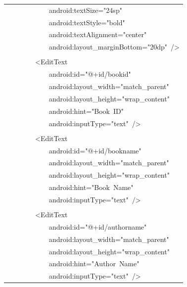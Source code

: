 \documentclass[a4paper,12pt]{article}
\begin{document}
\begin{longtable}{|p{}|}
{\ttfamily\small \ \ \ \ \ \ \ \ \ \ \ \ android:textSize="24sp"} \\
{\ttfamily\small \ \ \ \ \ \ \ \ \ \ \ \ android:textStyle="bold"} \\
{\ttfamily\small \ \ \ \ \ \ \ \ \ \ \ \ android:textAlignment="center"} \\
{\ttfamily\small \ \ \ \ \ \ \ \ \ \ \ \ android:layout\_marginBottom="20dp"\ /\textgreater{}} \\
\strut \\
{\ttfamily\small \ \ \ \ \ \ \ \ \textless{}EditText} \\
{\ttfamily\small \ \ \ \ \ \ \ \ \ \ \ \ android:id="@+id/bookid"} \\
{\ttfamily\small \ \ \ \ \ \ \ \ \ \ \ \ android:layout\_width="match\_parent"} \\
{\ttfamily\small \ \ \ \ \ \ \ \ \ \ \ \ android:layout\_height="wrap\_content"} \\
{\ttfamily\small \ \ \ \ \ \ \ \ \ \ \ \ android:hint="Book\ ID"} \\
{\ttfamily\small \ \ \ \ \ \ \ \ \ \ \ \ android:inputType="text"\ /\textgreater{}} \\
\strut \\
{\ttfamily\small \ \ \ \ \ \ \ \ \textless{}EditText} \\
{\ttfamily\small \ \ \ \ \ \ \ \ \ \ \ \ android:id="@+id/bookname"} \\
{\ttfamily\small \ \ \ \ \ \ \ \ \ \ \ \ android:layout\_width="match\_parent"} \\
{\ttfamily\small \ \ \ \ \ \ \ \ \ \ \ \ android:layout\_height="wrap\_content"} \\
{\ttfamily\small \ \ \ \ \ \ \ \ \ \ \ \ android:hint="Book\ Name"} \\
{\ttfamily\small \ \ \ \ \ \ \ \ \ \ \ \ android:inputType="text"\ /\textgreater{}} \\
\strut \\
{\ttfamily\small \ \ \ \ \ \ \ \ \textless{}EditText} \\
{\ttfamily\small \ \ \ \ \ \ \ \ \ \ \ \ android:id="@+id/authorname"} \\
{\ttfamily\small \ \ \ \ \ \ \ \ \ \ \ \ android:layout\_width="match\_parent"} \\
{\ttfamily\small \ \ \ \ \ \ \ \ \ \ \ \ android:layout\_height="wrap\_content"} \\
{\ttfamily\small \ \ \ \ \ \ \ \ \ \ \ \ android:hint="Author\ Name"} \\
{\ttfamily\small \ \ \ \ \ \ \ \ \ \ \ \ android:inputType="text"\ /\textgreater{}} \\

\end{longtable}
\end{document}
